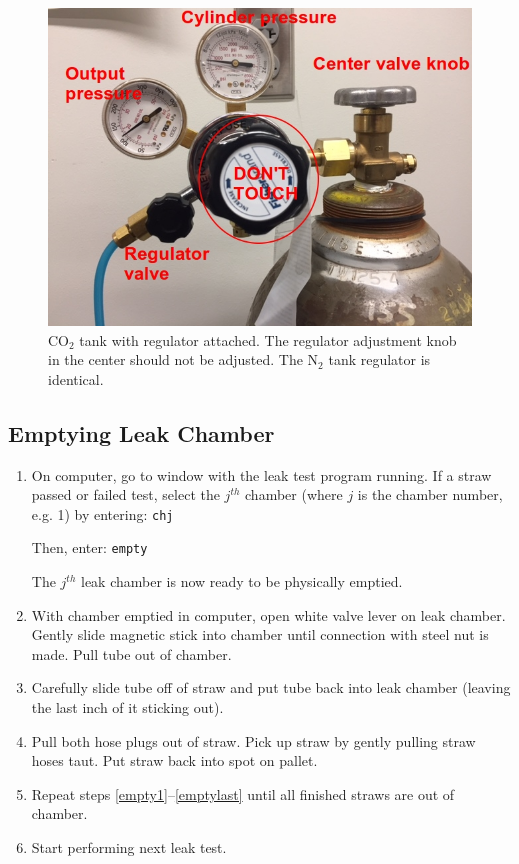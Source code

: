 \documentclass[12pt]{article}
\begin{document}
\begin{figure}
	\center
	\includegraphics[scale=0.5]{co2tank}
	\caption{CO$_2$ tank with regulator attached. The regulator adjustment knob in the center should not be adjusted. The N$_2$ tank regulator is identical.}
\end{figure}

\subsection{Emptying Leak Chamber}
	\begin{enumerate}
		\item On computer, go to window with the leak test program running. If a straw passed or failed test, select the $j^{th}$ chamber (where $j$ is the chamber number, e.g. 1) by entering: \texttt{chj} 
		
Then, enter: \texttt{empty}

The $j^{th}$ leak chamber is now ready to be physically emptied. \label{empty1}

	\item With chamber emptied in computer, open white valve lever on leak chamber. Gently slide magnetic stick into chamber until connection with steel nut is made. Pull tube out of chamber.
	\item Carefully slide tube off of straw and put tube back into leak chamber (leaving the last inch of it sticking out). 
	\item Pull both hose plugs out of straw. Pick up straw by gently pulling straw hoses taut. Put straw back into spot on pallet. \label{emptylast}
	\item Repeat steps \ref{empty1}--\ref{emptylast} until all finished straws are out of chamber.
	\item Start performing next leak test.
	
\end{enumerate}
\end{document}
